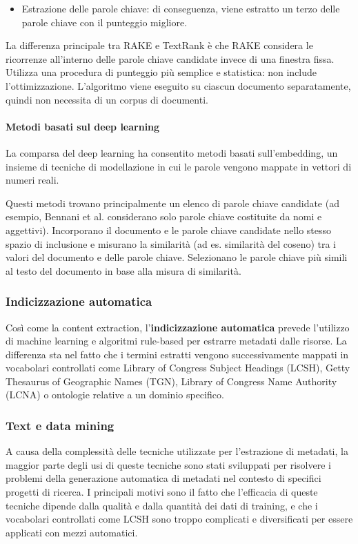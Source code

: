 \begin{itemize}
\item Estrazione delle parole chiave: di conseguenza, viene estratto un terzo delle parole chiave con il punteggio migliore.
\end{itemize}

La differenza principale tra RAKE e TextRank è che RAKE considera le ricorrenze all'interno delle parole chiave candidate invece di una finestra fissa. Utilizza una procedura di punteggio più semplice e statistica: non include l'ottimizzazione. L'algoritmo viene eseguito su ciascun documento separatamente, quindi non necessita di un corpus di documenti.

\paragraph{Metodi basati sul deep learning}
La comparsa del deep learning ha consentito metodi basati sull'embedding, un insieme di tecniche di modellazione in cui le parole vengono mappate in vettori di numeri reali. 

Questi metodi trovano principalmente un elenco di parole chiave candidate (ad esempio, Bennani et al. considerano solo parole chiave costituite da nomi e aggettivi). Incorporano il documento e le parole chiave candidate nello stesso spazio di inclusione e misurano la similarità (ad es. similarità del coseno) tra i valori del documento e delle parole chiave. Selezionano le parole chiave più simili al testo del documento in base alla misura di similarità.

\subsubsection{Indicizzazione automatica}
Così come la content extraction, l'\textbf{indicizzazione automatica} prevede l'utilizzo di machine learning e algoritmi rule-based per estrarre metadati dalle risorse. La differenza sta nel fatto che i termini estratti vengono successivamente mappati in vocabolari controllati come Library of Congress Subject Headings (LCSH), Getty Thesaurus of Geographic Names (TGN), Library of Congress Name Authority (LCNA) o ontologie relative a un dominio specifico.

\subsubsection{Text e data mining}
A causa della complessità delle tecniche utilizzate per l'estrazione di metadati, la maggior parte degli usi di queste tecniche sono stati sviluppati per risolvere i problemi della generazione automatica di metadati nel contesto di specifici progetti di ricerca.
I principali motivi sono il fatto che l'efficacia di queste tecniche dipende dalla qualità e dalla quantità dei dati di training, e che i vocabolari controllati come LCSH sono troppo complicati e diversificati per essere applicati con mezzi automatici.

